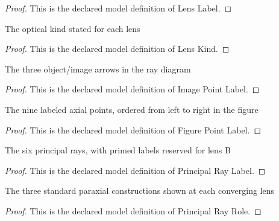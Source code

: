 \begin{proof}
  This is the declared model definition of Lens Label.
\end{proof}
\begin{definition}
  \label{def:physics:phyx-mini-0043:phyxminiproblems-problemphyxmini0043-lenskind}
  The optical kind stated for each lens
\end{definition}
\begin{proof}
  This is the declared model definition of Lens Kind.
\end{proof}
\begin{definition}
  \label{def:physics:phyx-mini-0043:phyxminiproblems-problemphyxmini0043-imagepointlabel}
  The three object/image arrows in the ray diagram
\end{definition}
\begin{proof}
  This is the declared model definition of Image Point Label.
\end{proof}
\begin{definition}
  \label{def:physics:phyx-mini-0043:phyxminiproblems-problemphyxmini0043-figurepointlabel}
  The nine labeled axial points, ordered from left to right in the figure
\end{definition}
\begin{proof}
  This is the declared model definition of Figure Point Label.
\end{proof}
\begin{definition}
  \label{def:physics:phyx-mini-0043:phyxminiproblems-problemphyxmini0043-principalraylabel}
  The six principal rays, with primed labels reserved for lens B
\end{definition}
\begin{proof}
  This is the declared model definition of Principal Ray Label.
\end{proof}
\begin{definition}
  \label{def:physics:phyx-mini-0043:phyxminiproblems-problemphyxmini0043-principalrayrole}
  The three standard paraxial constructions shown at each converging lens
\end{definition}
\begin{proof}
  This is the declared model definition of Principal Ray Role.
\end{proof}
